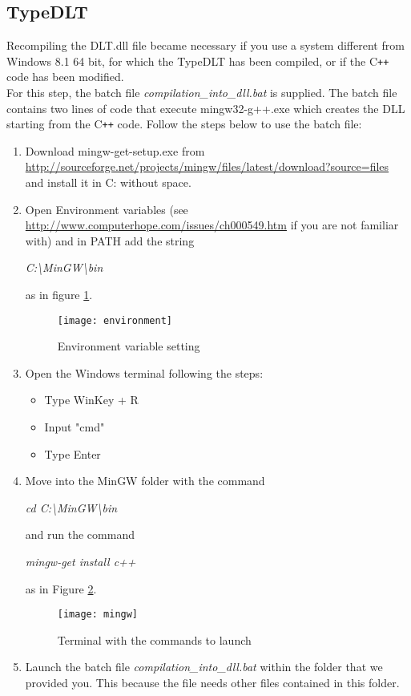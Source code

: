 \subsection{TypeDLT}
Recompiling the DLT.dll file became necessary if you use a system different from Windows 8.1 64 bit, for which the TypeDLT has been compiled, or if the C\texttt{++} code has been modified.\\
For this step, the batch file \textit{compilation\_into\_dll.bat} is supplied. The batch file contains two lines of code that execute mingw32-g++.exe which creates the DLL starting from the C\texttt{++} code. Follow the steps below to use the batch file:
\begin{enumerate}
\item Download mingw-get-setup.exe from \url{http://sourceforge.net/projects/mingw/files/latest/download?source=files} and install it in C: without space.
\item Open Environment variables (see \url{http://www.computerhope.com/issues/ch000549.htm} if you are not familiar with) and in PATH add the string 
\begin{center}
\textit{C:\textbackslash MinGW\textbackslash bin}
\end{center} as in figure \ref{img2:environment}.

\begin{figure}[h]
\centering
\texttt{[image: environment]}
\caption{\label{img2:environment} Environment variable setting}
\end{figure}


\item Open the Windows terminal following the steps:
\begin{itemize}
\item Type WinKey + R
\item Input "cmd"
\item Type Enter
\end{itemize}
\item Move into the MinGW folder with the command


 \begin{center}
  \textit{cd C:\textbackslash MinGW\textbackslash bin}   \end{center}  and run the command \begin{center}
  \textit{mingw-get install c++}  \end{center} 
as in Figure \ref{img2:mingw}.

\begin{figure}[h]
\centering
\texttt{[image: mingw]}
\caption{\label{img2:mingw} Terminal with the commands to launch}
\end{figure}

\item Launch the batch file \textit{compilation\_into\_dll.bat} within the folder that we provided you. This because the file needs other files contained in this folder.
\end{enumerate}



